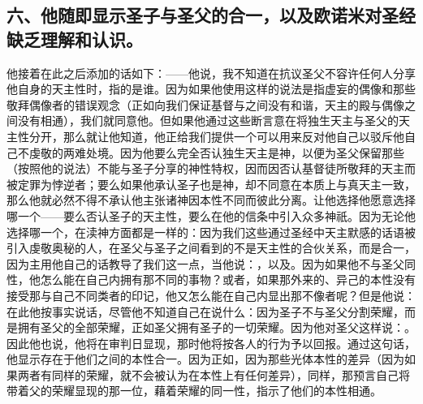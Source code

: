 
\subsection{六、他随即显示圣子与圣父的合一，以及欧诺米对圣经缺乏理解和认识。}

他接着在此之后添加的话如下：——他说，我不知道在抗议圣父不容许任何人分享他自身的天主性时，指的是谁。因为如果他使用这样的说法是指虚妄的偶像和那些敬拜偶像者的错误观念（正如向我们保证基督与之间没有和谐，天主的殿与偶像之间没有相通），我们就同意他。但如果他通过这些断言意在将独生天主与圣父的天主性分开，那么就让他知道，他正给我们提供一个可以用来反对他自己以驳斥他自己不虔敬的两难处境。因为他要么完全否认独生天主是神，以便为圣父保留那些（按照他的说法）不能与圣子分享的神性特权，因而因否认基督徒所敬拜的天主而被定罪为悖逆者；要么如果他承认圣子也是神，却不同意在本质上与真天主一致，那么他就必然不得不承认他主张诸神因本性不同而彼此分离。让他选择他愿意选择哪一个——要么否认圣子的天主性，要么在他的信条中引入众多神祇。因为无论他选择哪一个，在渎神方面都是一样的：因为我们这些通过圣经中天主默感的话语被引入虔敬奥秘的人，在圣父与圣子之间看到的不是天主性的合伙关系，而是合一，因为主用他自己的话教导了我们这一点，当他说：，以及。因为如果他不与圣父同性，他怎么能在自己内拥有那不同的事物？或者，如果那外来的、异己的本性没有接受那与自己不同类者的印记，他又怎么能在自己内显出那不像者呢？但是他说：在此他按事实说话，尽管他不知道自己在说什么：因为圣子不与圣父分割荣耀，而是拥有圣父的全部荣耀，正如圣父拥有圣子的一切荣耀。因为他对圣父这样说：。因此他也说，他将在审判日显现，那时他将按各人的行为予以回报。通过这句话，他显示存在于他们之间的本性合一。因为正如，因为那些光体本性的差异（因为如果两者有同样的荣耀，就不会被认为在本性上有任何差异），同样，那预言自己将带着父的荣耀显现的那一位，藉着荣耀的同一性，指示了他们的本性相通。\par

